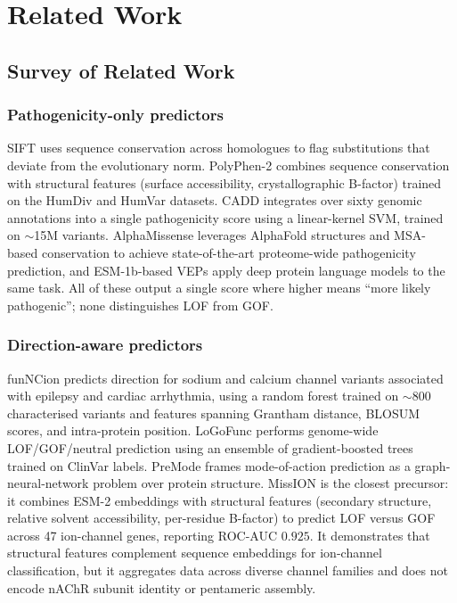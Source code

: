 \documentclass[rnd]{mas_proposal}
\begin{document}
\section{Related Work}

\subsection{Survey of Related Work}

\subsubsection{Pathogenicity-only predictors}
SIFT \cite{sift} uses sequence conservation across homologues to flag
substitutions that deviate from the evolutionary norm. PolyPhen-2
\cite{polyphen2} combines sequence conservation with structural features
(surface accessibility, crystallographic B-factor) trained on the HumDiv and
HumVar datasets. CADD \cite{cadd} integrates over sixty genomic annotations
into a single pathogenicity score using a linear-kernel SVM, trained on
$\sim$15M variants. AlphaMissense \cite{alphamissense} leverages AlphaFold
structures and MSA-based conservation to achieve state-of-the-art
proteome-wide pathogenicity prediction, and ESM-1b-based VEPs
\cite{esm1b} apply deep protein language models to the same task. All of these
output a single score where higher means ``more likely pathogenic''; none
distinguishes LOF from GOF.

\subsubsection{Direction-aware predictors}
funNCion \cite{funncion} predicts direction for sodium and calcium channel
variants associated with epilepsy and cardiac arrhythmia, using a random
forest trained on $\sim$800 characterised variants and features spanning
Grantham distance, BLOSUM scores, and intra-protein position. LoGoFunc
\cite{logofunc} performs genome-wide LOF/GOF/neutral prediction using an
ensemble of gradient-boosted trees trained on ClinVar labels. PreMode
\cite{premode} frames mode-of-action prediction as a graph-neural-network
problem over protein structure. MissION \cite{mission} is the closest
precursor: it combines ESM-2 embeddings with structural features (secondary
structure, relative solvent accessibility, per-residue B-factor) to predict
LOF versus GOF across 47 ion-channel genes, reporting ROC-AUC $0.925$.
It demonstrates that structural features complement sequence embeddings for
ion-channel classification, but it aggregates data across diverse channel
families and does not encode nAChR subunit identity or pentameric assembly.
\end{document}
